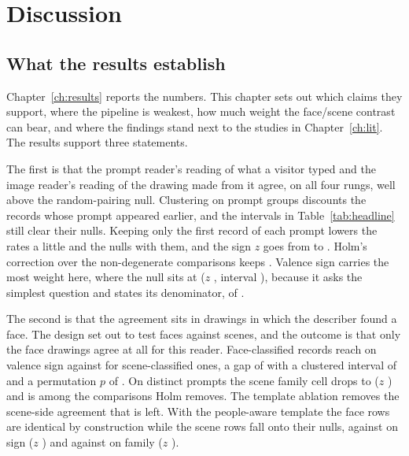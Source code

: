 \chapter{Discussion}
\label{ch:discussion}

\section{What the results establish}
\label{sec:disc-establish}

Chapter~\ref{ch:results} reports the numbers. This chapter sets out which claims they support, where the pipeline is weakest, how much weight the face/scene contrast can bear, and where the findings stand next to the studies in Chapter~\ref{ch:lit}. The results support three statements.

The first is that the prompt reader's reading of what a visitor typed and the image reader's reading of the drawing made from it agree, on all four rungs, well above the random-pairing null. Clustering on prompt groups discounts the \nRepeats{} records whose prompt appeared earlier, and the intervals in Table~\ref{tab:headline} still clear their nulls. Keeping only the first record of each prompt lowers the rates a little and the nulls with them, and the sign $z$ goes from \FullEmoSignZ{} to \DistEmoSignZ{}. Holm's correction over the \HolmM{} non-degenerate comparisons keeps \HolmSurvive{}. Valence sign carries the most weight here, \FullEmoSignObs{} where the null sits at \FullEmoSignNull{} ($z$ \FullEmoSignZ{}, interval \FullEmoSignCi{}), because it asks the simplest question and states its denominator, \FullEmoNSign{} of \FullEmoN{}.

The second is that the agreement sits in drawings in which the describer found a face. The design set out to test faces against scenes, and the outcome is that only the face drawings agree at all for this reader. Face-classified records reach \FullFaceSignObs{} on valence sign against \FullSceneSignObs{} for scene-classified ones, a gap of \DiffSignPp{} with a clustered interval of \DiffSignCi{} and a permutation $p$ of \DiffSignP{}. On distinct prompts the scene family cell drops to \DistSceneFamObs{} ($z$ \DistSceneFamZ{}) and is among the \HolmFail{} comparisons Holm removes. The template ablation removes the scene-side agreement that is left. With the people-aware template the face rows are identical by construction while the scene rows fall onto their nulls, \AblPeopleAwareSceneSignObs{} against \AblPeopleAwareSceneSignNull{} on sign ($z$ \AblPeopleAwareSceneSignZ{}) and \AblPeopleAwareSceneFamObs{} against \AblPeopleAwareSceneFamNull{} on family ($z$ \AblPeopleAwareSceneFamZ{}).

